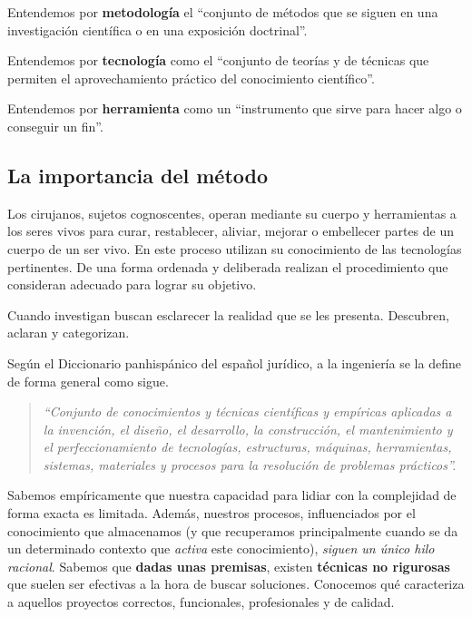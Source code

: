 Entendemos por \textbf{metodología} el ``conjunto de métodos que se siguen en una investigación
científica o en una exposición doctrinal''.

Entendemos por \textbf{tecnología} como el ``conjunto de teorías y de técnicas que permiten el
aprovechamiento práctico del conocimiento científico''.

Entendemos por \textbf{herramienta} como un ``instrumento que sirve para hacer algo o
conseguir un fin''.

\subsection{La importancia del método}

Los cirujanos, sujetos cognoscentes, operan mediante su cuerpo y herramientas a los seres
vivos para curar, restablecer, aliviar, mejorar o embellecer partes de un cuerpo de
un ser vivo. En este proceso utilizan su conocimiento de las tecnologías pertinentes.
De una forma ordenada y deliberada realizan el procedimiento que consideran adecuado para
lograr su objetivo.

Cuando investigan buscan esclarecer la realidad que se les presenta. Descubren, aclaran y
categorizan.

Según el Diccionario panhispánico del español jurídico, a la ingeniería se la define
de forma general como sigue.

\begin{quote}
    \textit{
    ``Conjunto de conocimientos y técnicas científicas y empíricas aplicadas a la invención,
    el diseño, el desarrollo, la construcción, el mantenimiento y el perfeccionamiento
    de tecnologías, estructuras, máquinas, herramientas, sistemas, materiales y procesos
    para la resolución de problemas prácticos''.
    }
\end{quote}

Sabemos empíricamente que nuestra capacidad para lidiar con la complejidad de forma exacta
es limitada. Además, nuestros procesos, influenciados por el conocimiento que almacenamos (y que recuperamos
principalmente cuando se da un determinado contexto que \textit{activa} este conocimiento),
\textit{siguen un único hilo racional}. Sabemos que \textbf{dadas unas premisas}, existen \textbf{técnicas
no rigurosas} que suelen ser efectivas a la hora de buscar soluciones. Conocemos qué caracteriza
a aquellos proyectos correctos, funcionales, profesionales y de calidad.


